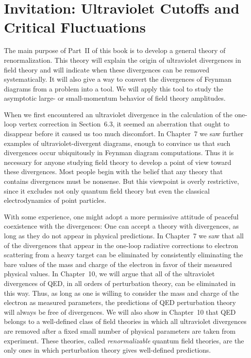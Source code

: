 \chapter{Invitation: Ultraviolet Cutoffs and Critical Fluctuations}

The main purpose of Part~II of this book is to develop a general theory of
renormalization.  This theory will explain the origin of ultraviolet
divergences in field theory and will indicate when these divergences can be
removed systematically.  It will also give a way to convert the divergences of
Feynman diagrams from a problem into a tool.  We will apply this tool to
study the asymptotic large- or small-momentum behavior of field theory
amplitudes.

When we first encountered an ultraviolet divergence in the calculation of the
one-loop vertex correction in Section~6.3, it seemed an aberration that ought
to disappear before it caused us too much discomfort.  In Chapter~7 we saw
further examples of ultraviolet-divergent diagrams, enough to convince us that
such divergences occur ubiquitously in Feynman diagram computations.  Thus it
is necessary for anyone studying field theory to develop a point of view
toward these divergences.  Most people begin with the belief that any theory
that contains divergences must be nonsense.  But this viewpoint is overly
restrictive, since it excludes not only quantum field theory but even the
classical electrodynamics of point particles.

With some experience, one might adopt a more permissive attitude of peaceful
coexistence with the divergences: One can accept a theory with divergences, as
long as they do not appear in physical predictions.  In Chapter~7 we saw that
all of the divergences that appear in the one-loop radiative corrections to
electron scattering from a heavy target can be eliminated by consistently
eliminating the bare values of the mass and charge of the electron in favor of
their measured physical values.  In Chapter~10, we will argue that all of the
ultraviolet divergences of QED, in all orders of perturbation theory, can be
eliminated in this way.  Thus, as long as one is willing to consider the mass
and charge of the electron as measured parameters, the predictions of QED
perturbation theory will always be free of divergences.  We will also show in
Chapter~10 that QED belongs to a well-defined class of field theories in which
all ultraviolet divergences are removed after a fixed small number of physical
parameters are taken from experiment.  These theories, called
\emph{renormalizable} quantum field theories, are the only ones in which
perturbation theory gives well-defined predictions.

